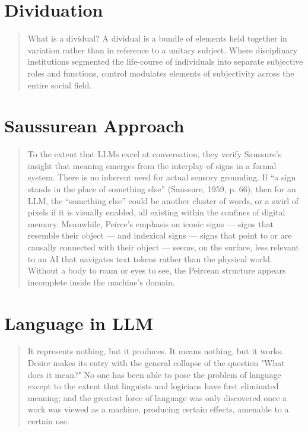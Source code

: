 \section{Dividuation}
\begin{quote}
	What is a dividual? A dividual is a bundle of elements held together in variation  rather than in reference to a unitary subject. Where disciplinary institutions  segmented the life-course of individuals into separate subjective roles and  functions, control modulates elements of subjectivity across the entire social field.
	\parencite[5]{mackenzie2021}
\end{quote}

\section{Saussurean Approach}
\begin{quote}
	To the extent that LLMs excel at conversation, they verify Saussure’s insight that meaning emerges from the interplay of signs in a formal system. There is no inherent need for actual sensory grounding. If “a sign stands in the place of something else” (Saussure, 1959, p. 66), then for an LLM, the “something else” could be another cluster of words, or a swirl of pixels if it is visually enabled, all existing within the confines of digital memory. Meanwhile, Peirce’s emphasis on iconic signs — signs that resemble their object — and indexical signs — signs that point to or are causally connected with their object — seems, on the surface, less relevant to an AI that navigates text tokens rather than the physical world. Without a body to roam or eyes to see, the Peircean structure appears incomplete inside the machine’s domain.
	\parencite[]{phd2025}
\end{quote}


\section{Language in LLM}

\begin{quote}
	It represents nothing, but it produces. It means nothing, but it works.
	Desire makes its entry with the general collapse of the question "What does
	it mean?" No one has been able to pose the problem of language except to the
	extent that linguists and logicians have first eliminated meaning; and the
	greatest force of language was only discovered once a work was viewed as a
	machine, producing certain effects, amenable to a certain use.
	\cite[109]{deleuze1983}
\end{quote}

